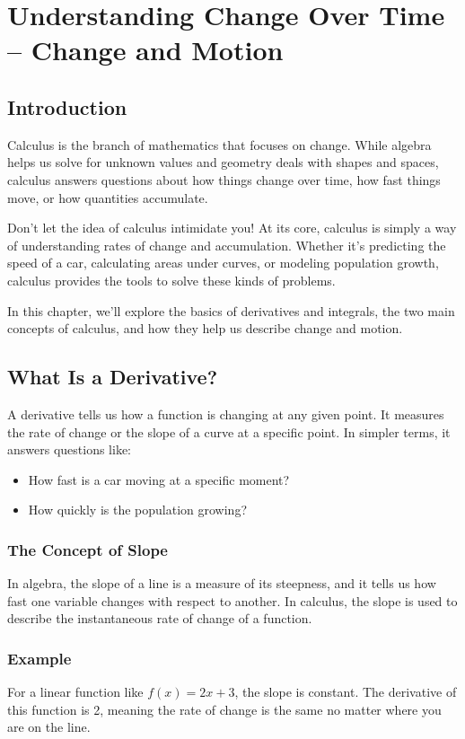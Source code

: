 \chapter{Understanding Change Over Time – Change and Motion}

\section{Introduction}
Calculus is the branch of mathematics that focuses on change. While algebra helps us solve for unknown values and geometry deals with shapes and spaces, calculus answers questions about how things change over time, how fast things move, or how quantities accumulate.

Don’t let the idea of calculus intimidate you! At its core, calculus is simply a way of understanding rates of change and accumulation. Whether it’s predicting the speed of a car, calculating areas under curves, or modeling population growth, calculus provides the tools to solve these kinds of problems.

In this chapter, we’ll explore the basics of derivatives and integrals, the two main concepts of calculus, and how they help us describe change and motion.

\section{What Is a Derivative?}
A derivative tells us how a function is changing at any given point. It measures the rate of change or the slope of a curve at a specific point. In simpler terms, it answers questions like:
\begin{itemize}
    \item How fast is a car moving at a specific moment?
    \item How quickly is the population growing?
\end{itemize}

\subsection{The Concept of Slope}
In algebra, the slope of a line is a measure of its steepness, and it tells us how fast one variable changes with respect to another. In calculus, the slope is used to describe the instantaneous rate of change of a function.

\subsection{Example}
For a linear function like \( f(x) = 2x + 3 \), the slope is constant. The derivative of this function is 2, meaning the rate of change is the same no matter where you are on the line.

